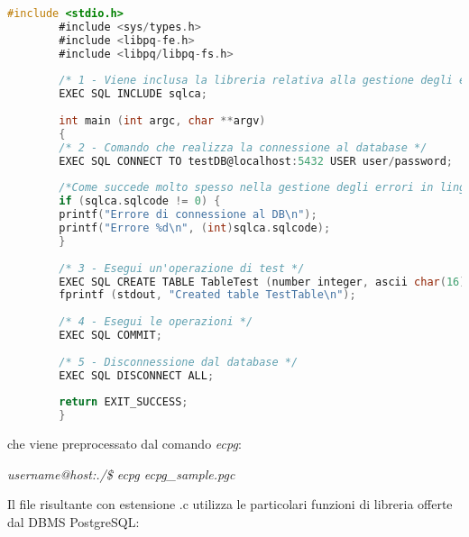 \documentclass[12pt,a4paper,onecolumn,x11names]{article}
\begin{document}
		\begin{lstlisting}[language=C, caption=testECPG.pgc]
		#include <stdio.h>
		#include <sys/types.h>
		#include <libpq-fe.h>
		#include <libpq/libpq-fs.h>
		
		/* 1 - Viene inclusa la libreria relativa alla gestione degli errori tramite la variabile globale sqlca (SQL communication area) */
		EXEC SQL INCLUDE sqlca;
		
		int main (int argc, char **argv)
		{
		/* 2 - Comando che realizza la connessione al database */
		EXEC SQL CONNECT TO testDB@localhost:5432 USER user/password;
		
		/*Come succede molto spesso nella gestione degli errori in linguaggio C, il valore ritornato da una funzione viene utilizzato anche come codice di errore, considerando lo 0 come esecuzione andata a buon fine */
		if (sqlca.sqlcode != 0)	{
		printf("Errore di connessione al DB\n");
		printf("Errore %d\n", (int)sqlca.sqlcode);
		}
		
		/* 3 - Esegui un'operazione di test */
		EXEC SQL CREATE TABLE TableTest (number integer, ascii char(16));
		fprintf (stdout, "Created table TestTable\n");
		
		/* 4 - Esegui le operazioni */
		EXEC SQL COMMIT;
		
		/* 5 - Disconnessione dal database */
		EXEC SQL DISCONNECT ALL;
		
		return EXIT_SUCCESS;
		}
		\end{lstlisting}
		
		che viene preprocessato dal comando \textit{ecpg}:
		
		\begin{center}
			\textit{username@host:./\$ ecpg ecpg\_sample.pgc}
		\end{center}
		
		Il file risultante con estensione \textsf{.c} utilizza le particolari funzioni di libreria offerte dal DBMS PostgreSQL:
		
\end{document}
